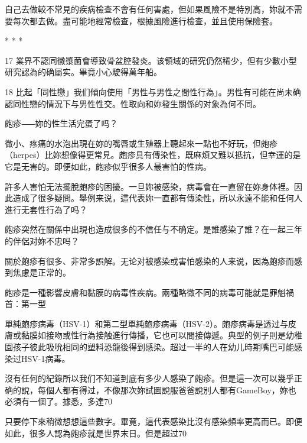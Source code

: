\documentclass[12pt,UTF8]{ctexbook}
\begin{document}
自己去做較不常見的疾病檢查不會有任何害處，但如果風險不是特別高，妳就不需要每次都去做。盡可能地經常檢查，根據風險進行檢查，並且使用保險套。





* * *



17	業界不認同黴漿菌會導致骨盆腔發炎。该領域的研究仍然稀少，但有少數小型研究認為的确屬实。畢竟小心駛得萬年船。



18	比起「同性戀」我们傾向使用「男性与男性之間性行為」。男性有可能在尚未确認同性戀的情況下与男性性交。性取向和妳發生關係的对象為何不同。





皰疹⸺妳的性生活完蛋了吗？




微小、疼痛的水泡出現在妳的嘴唇或生殖器上聽起來一點也不好玩，但皰疹（herpes）比妳想像得更常見。皰疹具有傳染性，既麻煩又難以抵抗，但幸運的是它是无害的。即便如此，皰疹似乎很多人最害怕的性病。

許多人害怕无法擺脫皰疹的困擾。一旦妳被感染，病毒會在一直留在妳身体裡。因此造成了很多疑問。舉例来说，這代表妳一直都有傳染性，所以永遠不能和任何人進行无套性行為了吗？

皰疹突然在關係中出現也造成很多的不信任与不确定。是誰感染了誰？在一起三年的伴侶对妳不忠吗？

關於皰疹有很多、非常多誤解。无论对被感染或害怕感染的人来说，因為皰疹而感到焦慮是正常的。

皰疹是一種影響皮膚和黏膜的病毒性疾病。兩種略微不同的病毒可能就是罪魁禍首：第一型

單純皰疹病毒（HSV-1）和第二型單純皰疹病毒（HSV-2）。皰疹病毒是透过与皮膚或黏膜如接吻或性行為接触進行傳播，它也可以間接傳遞。典型的例子則是幼稚園孩子彼此吸吮相同的塑料恐龍後得到感染。超过一半的人在幼儿時期嘴巴可能感染过HSV-1病毒。

沒有任何的紀錄所以我们不知道到底有多少人感染了皰疹。但是這一次可以幾乎正确的說，每個人都有得过，不像那次妳試圖說服爸爸說別人都有GameBoy，妳也必須有一個了。據悉，多達70%

只要停下來稍微想想這些數字。畢竟，這代表感染比沒有感染頻率更高而已。即便如此，很多人認為皰疹就是世界末日。但是超过70%
\end{document}

